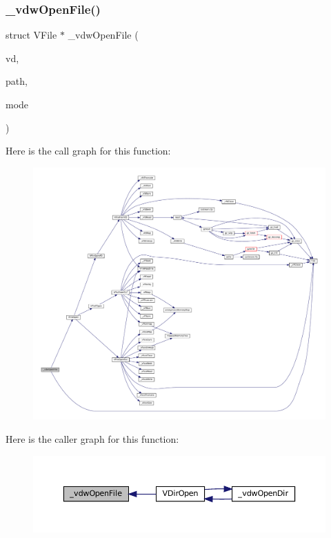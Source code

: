 \subsubsection{\texorpdfstring{\+\_\+vdw\+Open\+File()}{\_vdwOpenFile()}}
{\footnotesize\ttfamily struct V\+File $\ast$ \+\_\+vdw\+Open\+File (\begin{DoxyParamCaption}\item[{struct V\+Dir $\ast$}]{vd,  }\item[{const char $\ast$}]{path,  }\item[{\mbox{\hyperlink{ioapi_8h_a787fa3cf048117ba7123753c1e74fcd6}{int}}}]{mode }\end{DoxyParamCaption})\hspace{0.3cm}{\ttfamily [static]}}

Here is the call graph for this function\+:
\nopagebreak
\begin{figure}[H]
\begin{center}
\leavevmode
\includegraphics[width=350pt]{vfs-w32_8c_a748986f90f041704959b73a453216e4f_cgraph}
\end{center}
\end{figure}
Here is the caller graph for this function\+:
\nopagebreak
\begin{figure}[H]
\begin{center}
\leavevmode
\includegraphics[width=350pt]{vfs-w32_8c_a748986f90f041704959b73a453216e4f_icgraph}
\end{center}
\end{figure}
\mbox{\label{vfs-w32_8c_aa13a5e3490d91a1207db9f34666b12a1}} 
